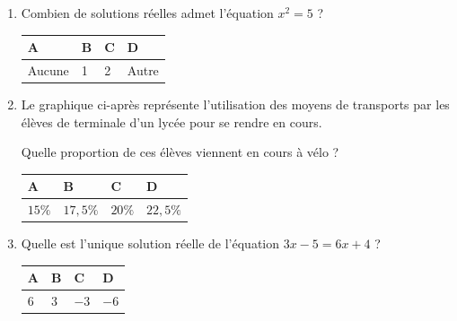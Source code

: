 \documentclass[oneside,12pt]{exam}          %
\begin{document}
\begin{enumerate}[label=\underline{Question \no\arabic*} :  , leftmargin=* , itemsep=5mm]

	\item Combien de solutions réelles admet l'équation $x^2 = 5$ ?
	
		\hspace{\linewidth-\textwidth}
		\renewcommand{\arraystretch}{1.5}
		\begin{tabular}{| P{0.22\textwidth} | P{0.22\textwidth} | P{0.22\textwidth} | P{0.22\textwidth} |} \hline
			A & B & C & D \\ \hline
			Aucune & 1 & 2 & Autre \\ \hline
		\end{tabular}



	\item
	\begin{minipage}{0.45\textwidth} \restoreskip
		Le graphique ci-après représente l'utilisation des moyens de transports par les élèves de terminale d'un lycée pour se rendre en cours.
		
		Quelle proportion de ces élèves viennent en cours à vélo ?
	\end{minipage}
	\begin{minipage}{0.35\textwidth}
	\end{minipage}
	
	
		\hspace{\linewidth-\textwidth}
		\renewcommand{\arraystretch}{1.5}
		\begin{tabular}{| P{0.22\textwidth} | P{0.22\textwidth} | P{0.22\textwidth} | P{0.22\textwidth} |} \hline
			A & B & C & D \\ \hline
			$15\%$& $17,5\%$ & $20\%$ & $22,5\%$ \\ \hline
		\end{tabular}
		
		

	\item Quelle est l'unique solution réelle de l'équation $3x - 5 = 6x + 4$ ?
	
		\hspace{\linewidth-\textwidth}
		\renewcommand{\arraystretch}{1.5}
		\begin{tabular}{| P{0.22\textwidth} | P{0.22\textwidth} | P{0.22\textwidth} | P{0.22\textwidth} |} \hline
			A & B & C & D \\ \hline
			$6$ & $3$ & $-3$ & $-6$ \\ \hline
		\end{tabular}
		

\end{enumerate}
\end{document}
